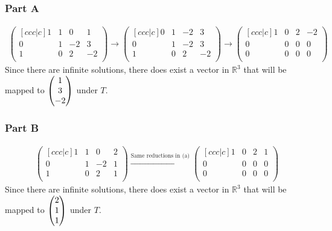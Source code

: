 \documentclass[12pt,titlepage]{extarticle}
\begin{document}
\subsubsection*{Part A}
\begin{align*}
    \begin{pmatrix}[ccc|c]
        1 & 1 & 0  & 1  \\
        0 & 1 & -2 & 3  \\
        1 & 0 & 2  & -2 \\
    \end{pmatrix} \rightarrow
    \begin{pmatrix}[ccc|c]
        0 & 1 & -2  & 3  \\
        0 & 1 & -2 &  3  \\
        1 & 0 & 2  & -2 \\
    \end{pmatrix} \rightarrow
    \begin{pmatrix}[ccc|c]
        1 & 0 & 2 & -2 \\
        0 & 0 & 0 & 0  \\
        0 & 0 & 0 & 0  \\
    \end{pmatrix}
\end{align*}
Since there are infinite solutions, there does exist a vector in $\mathbb{R}^3$ that will be mapped to $\mqty(1 \\ 3 \\ -2)$ under $T$.

\subsubsection*{Part B}
\begin{align*}
    \begin{pmatrix}[ccc|c]
        1 & 1 & 0  & 2  \\
        0 & 1 & -2 & 1  \\
        1 & 0 & 2  & 1 \\
    \end{pmatrix} \xrightarrow{\text{Same reductions in (a)}}
    \begin{pmatrix}[ccc|c]
        1 & 0 & 2 & 1  \\
        0 & 0 & 0 & 0  \\
        0 & 0 & 0 & 0 \\
    \end{pmatrix}
\end{align*}
Since there are infinite solutions, there does exist a vector in $\mathbb{R}^3$ that will be mapped to $\mqty(2 \\ 1 \\ 1)$ under $T$.
\end{document}
